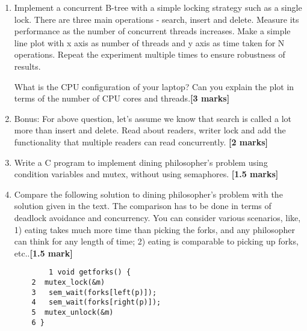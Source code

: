 \documentclass[]{article}
\begin{document}
\begin{enumerate}
	\item Implement a concurrent B-tree with a simple locking
	strategy such as a single lock. There are three main operations - search, insert and delete. Measure its performance as the number of
	concurrent threads increases. Make a simple line plot with x axis as number of threads and y axis as time taken for N operations. Repeat the experiment multiple times to ensure robustness of results.
	
	What is the CPU configuration of your laptop? Can you explain the plot in terms of the number of CPU cores and threads.\textbf{[3 marks]}
	
	\item Bonus: For above question, let's assume we know that search is called a lot more than insert and delete. Read about readers, writer lock and add the functionality that multiple readers can read concurrently.  \textbf{[2 marks]}
	
	\item Write a C program to implement dining philosopher's problem using condition variables and mutex, without using semaphores. \textbf{[1.5 marks]}
	
	\item 	Compare the following solution to dining philosopher's problem with the solution given in the text. The comparison has to be done in terms of deadlock avoidance and concurrency. You can consider various scenarios, like, 1) eating takes much more time than picking the forks, and any philosopher can think for any length of time; 2) eating is comparable to picking up forks, etc..\textbf{[1.5 mark]}
	
	\begin{verbatim}
		1 void getforks() { 
	2  mutex_lock(&m)
	3   sem_wait(forks[left(p)]); 
	4   sem_wait(forks[right(p)]); 
	5  mutex_unlock(&m)
	6 } 	

	\end{verbatim}  
	 
\end{enumerate}
\end{document}

